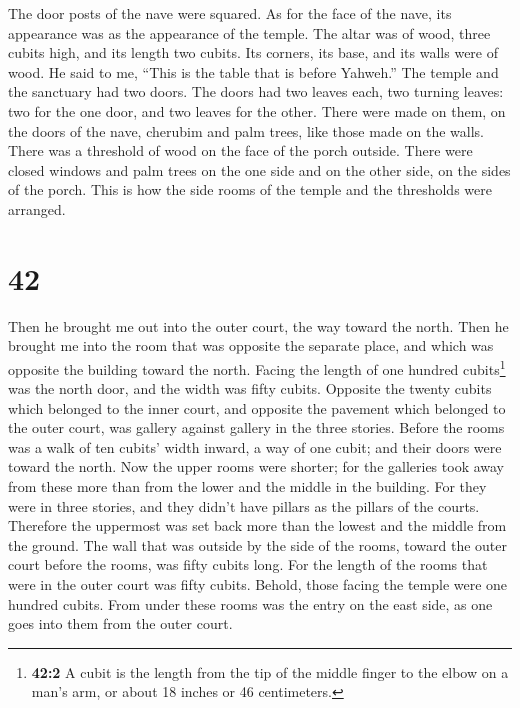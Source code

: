  The door posts of the nave were squared. As for the face
of the nave, its appearance was as the appearance of the temple.
 The altar was of wood, three cubits high, and its length
two cubits. Its corners, its base, and its walls were of wood. He said
to me, ``This is the table that is before Yahweh.''  The
temple and the sanctuary had two doors.  The doors had
two leaves each, two turning leaves: two for the one door, and two
leaves for the other.  There were made on them, on the
doors of the nave, cherubim and palm trees, like those made on the
walls. There was a threshold of wood on the face of the porch outside.
 There were closed windows and palm trees on the one side
and on the other side, on the sides of the porch. This is how the side
rooms of the temple and the thresholds were arranged.

\hypertarget{section-40}{%
\section{42}\label{section-40}}

 Then he brought me out into the outer court, the way
toward the north. Then he brought me into the room that was opposite the
separate place, and which was opposite the building toward the north.
 Facing the length of one hundred cubits\footnote{\textbf{42:2}
  A cubit is the length from the tip of the middle finger to the elbow
  on a man's arm, or about 18 inches or 46 centimeters.} was the north
door, and the width was fifty cubits.  Opposite the twenty
cubits which belonged to the inner court, and opposite the pavement
which belonged to the outer court, was gallery against gallery in the
three stories.  Before the rooms was a walk of ten cubits'
width inward, a way of one cubit; and their doors were toward the north.
 Now the upper rooms were shorter; for the galleries took
away from these more than from the lower and the middle in the building.
 For they were in three stories, and they didn't have
pillars as the pillars of the courts. Therefore the uppermost was set
back more than the lowest and the middle from the ground. 
The wall that was outside by the side of the rooms, toward the outer
court before the rooms, was fifty cubits long.  For the
length of the rooms that were in the outer court was fifty cubits.
Behold, those facing the temple were one hundred cubits. 
From under these rooms was the entry on the east side, as one goes into
them from the outer court.

